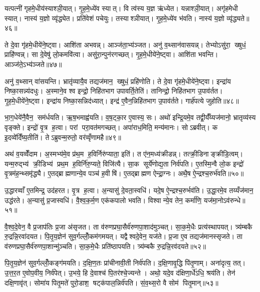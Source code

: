 यत्पत्नी॑ गृहमे॒धीय॑स्याश्ञी॒यात्। गृ॒ह॒मे॒ध्ये॑व स्यात्। वि त्व॑स्य य॒ज्ञ ऋ॑ध्येत। यन्नाश्ञी॒यात्। अगृ॑हमेधी स्यात्। नास्य॑ य॒ज्ञो व्यृ॑द्ध्येत। प्रति॑वेशं पचेयुः। तस्याश्ञीयात्। गृ॒ह॒मे॒ध्ये॑व भ॑वति। नास्य॑ य॒ज्ञो व्यृ॑द्ध्यते॥४६॥

ते दे॒वा गृ॑हमे॒धीये॑ने॒ष्ट्वा। आशि॑ता अभवन्न्। आञ्ज॑ता॒भ्य॑ञ्जत। अनु॑ व॒थ्सान॑वासयन्न्। तेभ्योऽसु॑रा॒ ख्षुधं॒ प्राहि॑ण्वन्न्। सा दे॒वेषु॑ लो॒कमवि॑त्वा। असु॑रा॒न्पुन॑रगच्छत्। गृ॒ह॒मे॒धीये॑ने॒ष्ट्वा। आशि॑ता भवन्ति। आञ्ज॑ते॒ऽभ्य॑ञ्जते॥४७॥

अनु॑ व॒थ्सान् वा॑सयन्ति। भ्रातृ॑व्यायै॒व तद्यज॑मान॒ ख्षुधं॒ प्रहि॑णोति। ते दे॒वा गृ॑हमे॒धीये॑ने॒ष्ट्वा। इन्द्रा॑य निष्का॒सन्न्य॑दधुः। अ॒स्माने॒व श्व इन्द्रो॒ निहि॑तभाग उपावर्ति॒तेति॑। तानिन्द्रो॒ निहि॑तभाग उ॒पाव॑र्तत। गृ॒ह॒मे॒धीये॑ने॒ष्ट्वा। इन्द्रा॑य निष्का॒सन्निद॑ध्यात्। इन्द्र॑ ए॒वैन॒न्निहि॑तभाग उ॒पाव॑र्तते। गार्\mbox{}ह॑पत्ये जुहोति॥४८॥

भा॒ग॒धेये॑नै॒वैन॒ सम॑र्धयति। ऋ॒ष॒भमाह्व॑यति। व॒ष॒ट्का॒र ए॒वास्य॒ सः। अथो॑ इन्द्रि॒यमे॒व तद्वी॒र्यँ॑य्यज॑मानो॒ भ्रातृव्य॑स्य वृङ्क्ते। इन्द्रो॑ वृ॒त्र ह॒त्वा। परां परा॒वत॑मगच्छत्। अपा॑राध॒मिति॒ मन्य॑मानः। सोऽब्रवीत्। क इ॒दव्वे॑दिँष्य॒तीति॑। तेऽब्रुवन्म॒रुतो॒ वर॑व्वृँणामहै॥४९॥

अथ॑ व॒यव्वेँ॑दाम। अ॒स्मभ्य॑मे॒व प्र॑थ॒म ह॒विर्निरु॑प्याता॒ इति॑। त ए॑न॒मध्य॑क्रीडन्न्। तत्क्री॒डिनाङ्क्रीडि॒त्वम्। यन्म॒रुद्भ्य॑ क्री॒डिभ्य॑ प्रथ॒म ह॒विर्नि॑रु॒प्यते॒ विजि॑त्यै। सा॒क सूर्ये॑णोद्य॒ता निर्व॑पति। ए॒तस्मि॒न्वै लो॒क इन्द्रो॑ वृ॒त्रम॑ह॒न्थ्समृ॑द्ध्यै। ए॒तद्ब्राह्मणान्ये॒व पञ्च॑ ह॒वीषि॑। ए॒तद्ब्राह्मण ऐन्द्रा॒ग्नः। अथै॒ष ऐ॒न्द्रश्च॒रुर्भ॑वति॥५०॥

उ॒द्धारव्वाँ ए॒तमिन्द्र॒ उद॑हरत। वृ॒त्र ह॒त्वा। अ॒न्यासु॑ दे॒वता॒स्वधि॑। यदे॒ष ऐ॒न्द्रश्च॒रुर्भव॑ति। उ॒द्धा॒रमे॒व तय्यँज॑मान॒ उद्ध॑रते। अ॒न्यासु॑ प्र॒जास्वधि॑। वै॒श्व॒क॒र्म॒ण एक॑कपालो भवति। विश्वान्ये॒व तेन॒ कर्मा॑णि॒ यज॑मा॒नोऽव॑रुन्धे॥५१॥\anuvakamend[ऋ॒द्ध्य॒ते॒ऽभ्य॑ञ्जते जुहोति वृणामहै भवत्य॒ष्टौ च॑]

वै॒श्व॒दे॒वेन॒ वै प्र॒जाप॑तिः प्र॒जा अ॑सृजत। ता व॑रुणप्रघा॒सैर्व॑रुणपा॒शाद॑मुञ्चत्। सा॒क॒मे॒धैः प्रत्य॑स्थापयत्। त्र्य॑म्बकै रु॒द्रन्नि॒रवा॑दयत। पि॒तृ॒य॒ज्ञेन॑ सुव॒र्गल्लोँ॒कम॑गमयत्। यद्वैश्वदे॒वेन॒ यज॑ते। प्र॒जा ए॒व तद्यज॑मानस्सृजते। ता व॑रुणप्रघा॒सैर्व॑रुणपा॒शान्मु॑ञ्चति। सा॒क॒मे॒धैः प्रति॑ष्ठापयति। त्र्य॑म्बकै रु॒द्रन्नि॒रव॑दयते॥५२॥

पि॒तृ॒य॒ज्ञेन॑ सुव॒र्गल्लोँ॒कङ्ग॑मयति। द॒क्षि॒ण॒तः प्रा॑चीनावी॒ती निर्व॑पति। द॒क्षि॒णावृ॒द्धि पि॑तृ॒णाम्। अना॑दृत्य॒ तत्। उ॒त्त॒र॒त ए॒वोप॒वीय॒ निर्व॑पेत्। उ॒भये॒ हि दे॒वाश्च॑ पि॒तर॑श्चे॒ज्यन्ते। अथो॒ यदे॒व द॑क्षिणा॒र्धे॑ऽधि॒ श्रय॑ति। तेन॑ दक्षि॒णावृ॑त्। सोमा॑य पितृ॒मते॑ पुरो॒डाश॒ षट्क॑पाल॒न्निर्व॑पति। सं॒व॒थ्स॒रो वै सोम॑ पितृ॒मान्॥५३॥

